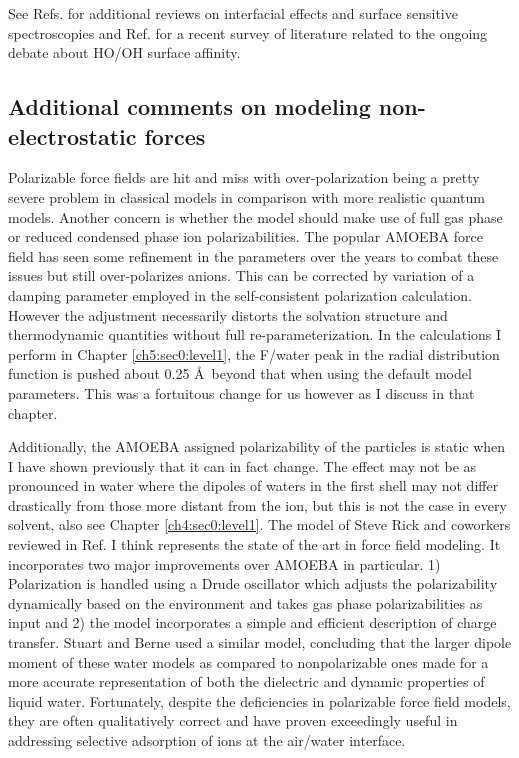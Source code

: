 \begin{intro}
   See Refs. \cite{bjorneholm2016water,bonn2015molecular,ishiyama2014theoretical,wang2016surface} for additional reviews on interfacial effects and surface sensitive 
   spectroscopies and Ref. \cite{agmon2016protons} for a recent survey of literature related to the ongoing debate about HO\sur{+}/OH\sur{-} surface affinity.
   
  \subsection{\label{ch1:sec3:level6}Additional comments on modeling non-electrostatic forces}
   Polarizable force fields are hit and miss with over-polarization being a pretty severe problem in classical models\cite{vdS2011surfacepref} in comparison with more realistic 
   quantum models\cite{baer2011toward}. Another concern is whether the model should make use of full gas phase or reduced condensed phase ion polarizabilities\cite{masia2009polarize,patel2010polarizability}.
   The popular AMOEBA force field has seen some refinement in the parameters over the years to combat these 
   issues\cite{laury2015revised,ren2003amoeba,ren2003amoebaion,amoeba,ponder2010znamoeba,wang2013systematic} but still over-polarizes anions. This can be corrected by variation 
   of a damping parameter employed in the self-consistent polarization calculation\cite{pollard2014cpa1}. However the adjustment necessarily distorts the solvation structure and 
   thermodynamic quantities without full re-parameterization. In the calculations I perform in Chapter \ref{ch5:sec0:level1}, the F\sur{-}/water peak in the radial distribution
   function is pushed about 0.25 \AA~beyond that when using the default model parameters. This was a fortuitous change for us however as I discuss in that chapter.
   
   Additionally, the AMOEBA assigned polarizability of the particles is static when I have shown previously that it can in fact change. The effect may not be as pronounced in 
   water where the dipoles of waters in the first shell may not differ drastically from those more distant from the ion, but this is not the case in every solvent\cite{ayse2016ecpc}, 
   also see Chapter \ref{ch4:sec0:level1}. The model of Steve Rick and coworkers reviewed in Ref. \cite{rick2016polct} I think represents the state of the art in force field 
   modeling. It incorporates two major improvements over AMOEBA in particular. 1) Polarization is handled using a Drude oscillator which adjusts the polarizability dynamically
   based on the environment and takes gas phase polarizabilities as input and 2) the model incorporates a simple and efficient description of charge transfer. Stuart and Berne 
   used a similar model, concluding that the larger dipole moment of these water models as compared to nonpolarizable ones made for a more accurate representation of both the
   dielectric and dynamic properties of liquid water\cite{stuart1996effects}. Fortunately, despite the deficiencies in polarizable force field models, they are often 
   qualitatively correct and have proven exceedingly useful in addressing selective adsorption of ions at the air/water interface.


\end{intro}
